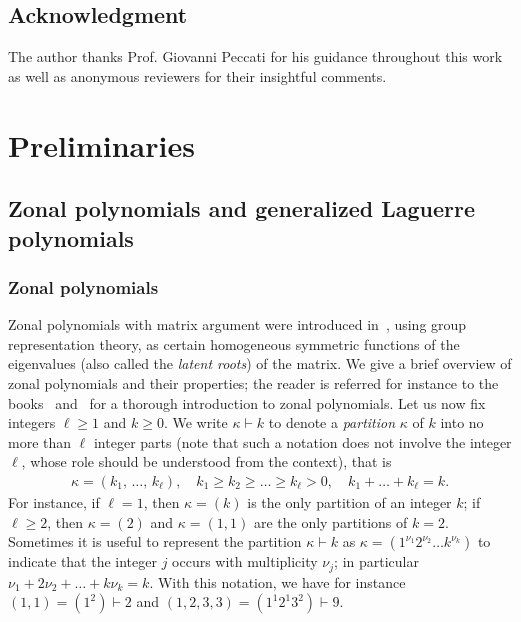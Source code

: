 \documentclass[AHL,Unicode,longabstracts,published]{cedram}
\begin{document}
\subsection*{Acknowledgment}
The author thanks Prof. Giovanni Peccati for his guidance throughout this work as well as anonymous reviewers for their insightful comments. 



\section{Preliminaries}\label{Prel}
\subsection{Zonal polynomials and generalized Laguerre polynomials}\label{SecZP}
\subsubsection*{Zonal polynomials}
Zonal polynomials with matrix argument were introduced in~\cite{J61}, using group representation theory, as certain homogeneous symmetric functions of the eigenvalues (also called the \emph{latent roots}) of the matrix. We give a brief overview of zonal polynomials and their properties; the reader is referred for instance to the books~\cite{BFZP} and~\cite{Ch2012} for a thorough introduction to zonal polynomials. Let us now fix integers $\ell\geq 1$ and $k\geq 0$. We write $\kappa \vdash k$ to denote a \emph{partition} $\kappa$ of $k$ into no more than $\ell$ integer parts (note that such a notation does not involve the integer $\ell$, whose role should be understood from the context), that is
\begin{gather*}
\kappa=(k_1,\,\ldots,\,k_{\ell}), \quad k_1\geq k_2\geq \ldots \geq k_{\ell}> 0, \quad k_1+\ldots+k_{\ell}=k.
\end{gather*}
For instance, if $\ell=1$, then $\kappa=(k)$ is the only partition of an integer $k$; if $\ell\geq 2$, then $\kappa = (2)$ and $\kappa=(1,1)$ are the only partitions of $k=2$. Sometimes it is useful to represent the partition $\kappa \vdash k$ as $\kappa=(1^{\nu_1} 2^{\nu_2} \ldots k^{\nu_k})$ to indicate that the integer $j$ occurs with multiplicity $\nu_j$; in particular $\nu_1+2\nu_2+\ldots+k\nu_k=k$. With this notation, we have for instance $(1,1)=(1^2) \vdash 2$ and $ (1,2,3,3)=(1^{1} 2^1 3^2) \vdash 9$.
\end{document}
